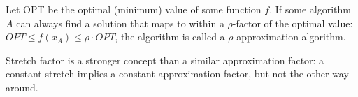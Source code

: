 
Let OPT be the optimal (minimum) value of some function \(f\). 
If some algorithm \(A\) can always find a solution that maps to within a \(\rho\)-factor of the optimal value: \(OPT \leq f(x_A) \leq \rho \cdot OPT\), the algorithm is called a \(\rho\)-approximation algorithm. 

\begin{remark}
	Stretch factor is a stronger concept than a similar approximation factor: a constant stretch implies a constant approximation factor, but not the other way around.
\end{remark}

